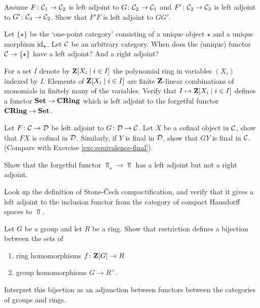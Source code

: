 \begin{exercise}
Assume $F\colon {\mathcal{C}}_1\to {\mathcal{C}}_2$ is left adjoint to $G\colon {\mathcal{C}}_2\to {\mathcal{C}}_1$ and $F'\colon {\mathcal{C}}_2\to {\mathcal{C}}_3$ is left adjoint to $G'\colon {\mathcal{C}}_3\to{\mathcal{C}}_2$. Show that $F'F$ is left adjoint to $GG'$. 
\end{exercise}

\begin{exercise}
Let $\{\star\}$ be the `one-point category' consisting of a unique object $\star$ and a unique morphism ${\rm id}_\star$. Let ${\mathcal{C}}$ be an arbitrary category. When does the (unique) functor ${\mathcal{C}} \to \{\star\}$ have a left adjoint? And a right adjoint?
\end{exercise}


\begin{exercise}
For a set $I$ denote by ${\mathbf{Z}}[X_i \mid i\in I]$ the polynomial ring in variables $(X_i)$ indexed by $I$. Elements of ${\mathbf{Z}}[X_i \mid i\in I]$ are finite ${\mathbf{Z}}$-linear combinations of monomials in finitely many of the variables. Verify that $I\mapsto {\mathbf{Z}}[X_i \mid i\in I]$ defines a functor $\mathbf{Set} \to \mathbf{CRing}$ which is left adjoint to the forgetful functor $\mathbf{CRing} \to \mathbf{Set}$.
\end{exercise}


\begin{exercise} 
Let $F\colon {\mathcal{C}} \to {\mathcal{D}}$ be left adjoint to $G\colon {\mathcal{D}} \to {\mathcal{C}}$. Let $X$ be a cofinal object in ${\mathcal{C}}$, show that $FX$ is cofinal in ${\mathcal{D}}$. Similarly, if $Y$ is final in ${\mathcal{D}}$, show that $GY$ is final in ${\mathcal{C}}$. (Compare with Exercise \ref{exc:equivalence-final}).
\end{exercise}

\begin{exercise}\label{exc:forget-base-point}
Show that the forgetful functor $\Top_\star \to \Top$ has a left adjoint but not a right adjoint.
\end{exercise}


\begin{exercise}
Look up the definition of Stone-\v{C}ech compactification, and verify that it gives a left adjoint to the inclusion functor from the category of compact Hausdorff spaces to $\Top$. 
\end{exercise}

\begin{exercise}
Let $G$ be a group and let $R$ be a  ring. Show that restriction defines a bijection between the sets of
\begin{enumerate}
\item ring homomorphisms $f\colon {\mathbf{Z}}[G] \to R$ 
\item group homomorphisms $G \to R^\times$.
\end{enumerate}
Interpret this bijection as an adjunction between functors between the categories of groups and rings.
\end{exercise}


